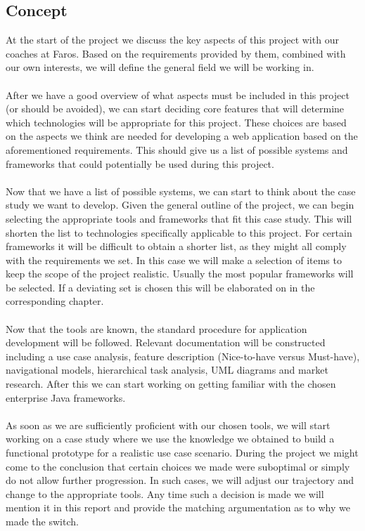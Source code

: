 \documentclass[12pt]{article}
\begin{document}
\subsection{Concept}
At the start of the project we discuss the key aspects of this project with our coaches at Faros. Based on the requirements provided by them, combined with our own interests, we will define the general field we will be working in. 
\\\\
After we have a good overview of what aspects must be included in this project (or should be avoided), we can start deciding core features that will determine which technologies will be appropriate for this project. These choices are based on the aspects we think are needed for developing a web application based on the aforementioned requirements. This should give us a list of possible systems and frameworks that could potentially be used during this project.
\\\\
Now that we have a list of possible systems, we can start to think about the case study we want to develop. Given the general outline of the project, we can begin selecting the appropriate tools and frameworks that fit this case study. This will shorten the list to technologies specifically applicable to this project. For certain frameworks it will be difficult to obtain a shorter list, as they might all comply with the requirements we set. In this case we will make a selection of items to keep the scope of the project realistic. Usually the most popular frameworks will be selected. If a deviating set is chosen this will be elaborated on in the corresponding chapter.
\\\\
Now that the tools are known, the standard procedure for application development will be followed. Relevant documentation will be constructed including a use case analysis, feature description (Nice-to-have versus Must-have), navigational models, hierarchical task analysis, UML diagrams and market research. After this we can start working on getting familiar with the chosen enterprise Java frameworks.
\\\\
As soon as we are sufficiently proficient with our chosen tools, we will start working on a case study where we use the knowledge we obtained to build a functional prototype for a realistic use case scenario. During the project we might come to the conclusion that certain choices we made were suboptimal or simply do not allow further progression. In such cases, we will adjust our trajectory and change to the appropriate tools. Any time such a decision is made we will mention it in this report and provide the matching argumentation as to why we made the switch.
\end{document}
